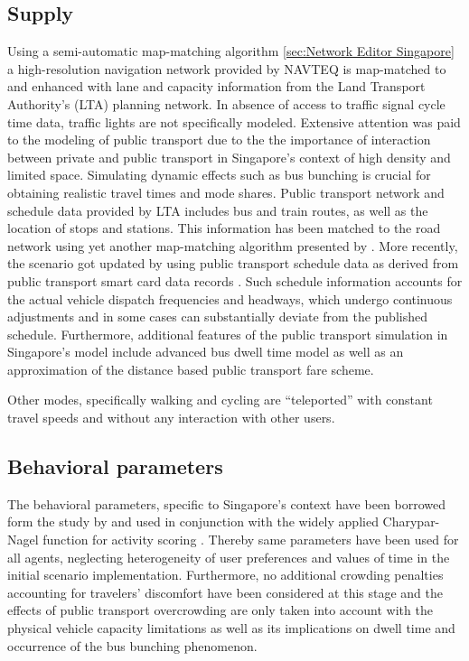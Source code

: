 \subsection{Supply}
Using a semi-automatic map-matching algorithm \ref{sec:Network Editor Singapore} a high-resolution navigation network provided by NAVTEQ is map-matched to and enhanced with lane and capacity information from the Land Transport Authority's (LTA) planning network. In absence of access to traffic signal cycle time data, traffic lights are not specifically modeled.
Extensive attention was paid to the modeling of public transport due to the the importance of interaction between private and public transport in Singapore’s context of high density and limited space. Simulating dynamic effects such as bus bunching is crucial for obtaining realistic travel times and mode shares. Public transport network and schedule data provided by LTA includes bus and train routes,  as well as the location of stops and stations. This information has been matched to the road network using yet another map-matching algorithm presented by \citet[][]{Ordonez_HKSTS_2011, Ordonez_Webpage_2011_4}. More recently, the scenario got updated by using public transport schedule data as derived from public transport smart card data records \citet[][]{Fourie_TechRep_FCL_2014}. Such schedule information accounts for the actual vehicle dispatch frequencies and headways, which undergo continuous adjustments and in some cases can substantially deviate from the published schedule. Furthermore, additional features of the public transport simulation in Singapore’s model include advanced bus dwell time model \cite[][]{SunEtAl_TransResA_2014} as well as an approximation of the distance based public transport fare scheme.

Other modes, specifically walking and cycling are ``teleported'' with constant travel speeds and without any interaction with other users. 

\subsection{Behavioral parameters}
The behavioral parameters, specific to Singapore's context have been borrowed form the study by \citet[][]{LTA_unpub_2009} and used in conjunction with the widely applied Charypar-Nagel function for activity scoring \citet[][]{CharyparNagel_Transportation_2005}. Thereby same parameters have been used for all agents, neglecting heterogeneity of user preferences and values of time in the initial scenario implementation. Furthermore, no additional crowding penalties accounting for travelers' discomfort have been considered at this stage and the effects of public transport overcrowding are only taken into account with the physical vehicle capacity limitations as well as its implications on dwell time and occurrence of the bus bunching phenomenon. 

